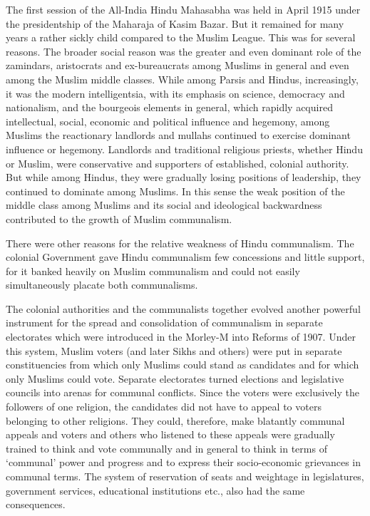 The first session of the All-India Hindu Mahasabha was held in April 1915 under the presidentship of the Maharaja of Kasim Bazar. But it remained for many years a rather sickly child compared to the Muslim League. This was for several reasons. The broader social reason was the greater and even dominant role of the zamindars, aristocrats and ex-bureaucrats among Muslims in general and even among the Muslim middle classes. While among Parsis and Hindus, increasingly, it was the modern intelligentsia, with its emphasis on science, democracy and nationalism, and the bourgeois elements in general, which rapidly acquired intellectual, social, economic and political influence and hegemony, among Muslims the reactionary landlords and mullahs continued to exercise dominant influence or hegemony. Landlords and traditional religious priests, whether Hindu or Muslim, were conservative and supporters of established, colonial authority. But while among Hindus, they were gradually losing positions of leadership, they continued to dominate among Muslims. In this sense the weak position of the middle class among Muslims and its social and ideological backwardness contributed to the growth of Muslim communalism. 

There were other reasons for the relative weakness of Hindu communalism. The colonial Government gave Hindu communalism few concessions and little support, for it banked heavily on Muslim communalism and could not easily simultaneously placate both communalisms. 

The colonial authorities and the communalists together evolved another powerful instrument for the spread and consolidation of communalism in separate electorates which were introduced in the Morley-M into Reforms of 1907. Under this system, Muslim voters (and later Sikhs and others) were put in separate constituencies from which only Muslims could stand as candidates and for which only Muslims could vote. Separate electorates turned elections and legislative councils into arenas for communal conflicts. Since the voters were exclusively the followers of one religion, the candidates did not have to appeal to voters belonging to other religions. They could, therefore, make blatantly communal appeals and voters and others who listened to these appeals were gradually trained to think and vote communally and in general to think in terms of ‘communal’ power and progress and to express their socio-economic grievances in communal terms. The system of reservation of seats and weightage in legislatures, government services, educational institutions etc., also had the same consequences. 

